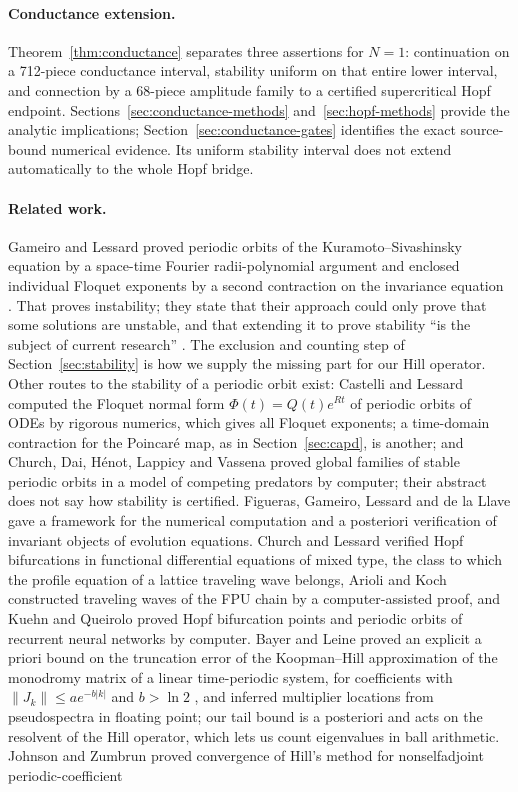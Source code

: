 \documentclass[11pt]{article}
\theoremstyle{definition}
\begin{document}
\paragraph{Conductance extension.} Theorem~\ref{thm:conductance} separates three assertions for $N=1$: continuation on a 712-piece conductance interval, stability uniform on that entire lower interval, and connection by a 68-piece amplitude family to a certified supercritical Hopf endpoint. Sections~\ref{sec:conductance-methods} and~\ref{sec:hopf-methods} provide the analytic implications; Section~\ref{sec:conductance-gates} identifies the exact source-bound numerical evidence. Its uniform stability interval does not extend automatically to the whole Hopf bridge.

\paragraph{Related work.} Gameiro and Lessard \cite{gl2017} proved periodic orbits of the Kuramoto--Sivashinsky equation by a space-time Fourier radii-polynomial argument and enclosed individual Floquet exponents by a second contraction on the invariance equation \cite[Sect.~7]{gl2017}. That proves instability; they state that their approach could only prove that some solutions are unstable, and that extending it to prove stability ``is the subject of current research'' \cite[Sect.~1]{gl2017}. The exclusion and counting step of Section~\ref{sec:stability} is how we supply the missing part for our Hill operator. Other routes to the stability of a periodic orbit exist: Castelli and Lessard \cite{cl2013} computed the Floquet normal form $\Phi(t) = Q(t)e^{Rt}$ of periodic orbits of ODEs by rigorous numerics, which gives all Floquet exponents; a time-domain contraction for the Poincar\'e map, as in Section~\ref{sec:capd}, is another; and Church, Dai, H\'enot, Lappicy and Vassena \cite{cdhlv2026} proved global families of stable periodic orbits in a model of competing predators by computer; their abstract does not say how stability is certified. Figueras, Gameiro, Lessard and de la Llave \cite{fgld2017} gave a framework for the numerical computation and a posteriori verification of invariant objects of evolution equations. Church and Lessard \cite{cl2022} verified Hopf bifurcations in functional differential equations of mixed type, the class to which the profile equation of a lattice traveling wave belongs, Arioli and Koch \cite{ak2020} constructed traveling waves of the FPU chain by a computer-assisted proof, and Kuehn and Queirolo \cite{kq2022} proved Hopf bifurcation points and periodic orbits of recurrent neural networks by computer. Bayer and Leine \cite{bl2026} proved an explicit a priori bound on the truncation error of the Koopman--Hill approximation of the monodromy matrix of a linear time-periodic system, for coefficients with $\|J_k\| \le a e^{-b|k|}$ and $b > \ln 2$ \cite[Theorem~4]{bl2026}, and inferred multiplier locations from pseudospectra in floating point; our tail bound is a posteriori and acts on the resolvent of the Hill operator, which lets us count eigenvalues in ball arithmetic. Johnson and Zumbrun \cite{jz2012} proved convergence of Hill's method for nonselfadjoint periodic-coefficient 
\end{document}

